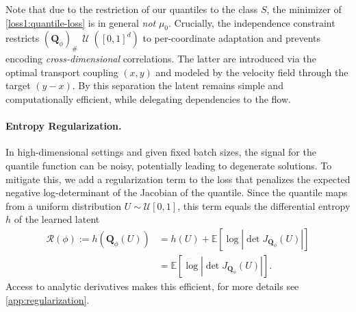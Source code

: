 \documentclass{article}
\DeclareMathOperator{\U}{\mathcal U}
\theoremstyle{plain}
\theoremstyle{definition}
\theoremstyle{remark}
\begin{document}
Note that due to the restriction of our quantiles to the class $S$, the minimizer of \eqref{loss1:quantile-loss} is in general \emph{not}  $\mu_0$. Crucially, the independence constraint restricts $(\mathbf Q_\phi)_\#\,\U([0,1]^d)$ to per-coordinate adaptation and prevents encoding \emph{cross-dimensional} correlations. The latter are introduced via the optimal transport coupling $(x,y)$ and modeled by the velocity field through the target $(y-x)$. By this separation the latent remains simple and computationally efficient, while delegating dependencies to the flow.



\paragraph{Entropy Regularization.}
In high-dimensional settings and given fixed batch sizes, the signal for the quantile function can be noisy, potentially leading to degenerate solutions. To mitigate this, we add a regularization term to the loss that penalizes the expected negative log-determinant of the Jacobian of the quantile. Since the quantile maps from a uniform distribution $U \sim \mathcal U[0,1]$, this term equals the differential entropy $h$ of the learned latent
\begin{align*}
 \mathcal{R}(\phi):= h(\mathbf Q_\phi(U)) &= h(U) + \mathbb{E}[\log |\det J_{\mathbf Q_\phi}(U)|] \\
    &= \mathbb{E}[\log |\det J_{\mathbf Q_\phi}(U)|].
\end{align*}
Access to analytic derivatives makes this efficient, for more details see \ref{app:regularization}.
\end{document}
